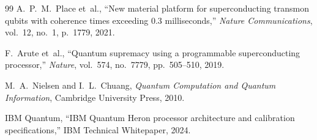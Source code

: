 \documentclass[11pt,a4paper]{article}
\begin{document}
\begin{thebibliography}{99}
A.~P.~M.~Place et~al.,
``New material platform for superconducting transmon qubits with coherence times exceeding 0.3 milliseconds,''
\emph{Nature Communications}, vol.~12, no.~1, p.~1779, 2021.

F.~Arute et~al.,
``Quantum supremacy using a programmable superconducting processor,''
\emph{Nature}, vol.~574, no.~7779, pp.~505--510, 2019.

M.~A.~Nielsen and I.~L.~Chuang,
\emph{Quantum Computation and Quantum Information},
Cambridge University Press, 2010.

IBM Quantum,
``IBM Quantum Heron processor architecture and calibration specifications,''
IBM Technical Whitepaper, 2024.
\end{thebibliography}
\end{document}
